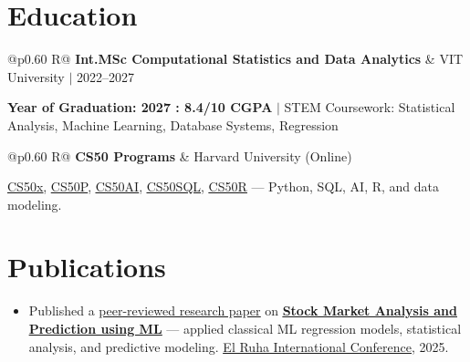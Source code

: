\documentclass[a4paper,10pt]{article}
\newcommand{\ulink}[2]{\href{#1}{\uline{#2}}}
\newcommand{\subheading}[1]{{\color[HTML]{0A0A0A}\fontsize{12}{14}\selectfont\bfseries #1}}
\newcommand{\meta}[1]{{\color[HTML]{5C5C5C}\fontsize{10.5}{12.5}\selectfont #1}}
\begin{document}
\vspace{2pt}

\section{Education}
\vspace{2pt}

\begin{tabularx}{\linewidth}{@{}p{0.60\linewidth} R@{}}
\subheading{Int.MSc Computational Statistics and Data Analytics} & \meta{VIT University $|$ 2022--2027}
\end{tabularx}
\vspace{1pt}
{\color[HTML]{3A3A3A}\fontsize{11}{14}\selectfont \textbf{Year of Graduation: 2027 : 8.4/10 CGPA} $|$ STEM Coursework: Statistical Analysis, Machine Learning, Database Systems, Regression}

\begin{tabularx}{\linewidth}{@{}p{0.60\linewidth} R@{}}
\subheading{CS50 Programs} & \meta{Harvard University (Online)}
\end{tabularx}
\vspace{1pt}
{\color[HTML]{3A3A3A}\fontsize{11}{14}\selectfont \ulink{https://cs50.harvard.edu/certificates/b14b78df-e05c-413e-a607-1dd27303053a}{CS50x}, \ulink{https://cs50.harvard.edu/certificates/32477052-9db4-49c4-a5a4-d7e58429ca2c}{CS50P}, \ulink{https://cs50.harvard.edu/certificates/9cdb4d4a-1250-4f8e-9fd7-191864e0f919}{CS50AI}, \ulink{https://cs50.harvard.edu/certificates/bc486f24-f085-4e61-8536-80940b97a1b9}{CS50SQL}, \ulink{https://cs50.harvard.edu/certificates/666838e6-a053-4d82-b179-a60fe745fd84}{CS50R} --- Python, SQL, AI, R, and data modeling.}

\vspace{2pt}

\section{Publications}
\vspace{2pt}
\begin{itemize}[nosep, leftmargin=1.5em, itemsep=1pt, topsep=2pt]
  \item {\color[HTML]{0A0A0A}\fontsize{11}{14}\selectfont
  Published a \ulink{https://www.elruha.org/_files/ugd/614b1f_6b95e1b697bf452b9907ba46e0151c05.pdf\#page=774}{peer-reviewed research paper} on \ulink{https://github.com/su-jin1425/Set-Project}{\textbf{Stock Market Analysis and Prediction using ML}} --- applied classical ML regression models, statistical analysis, and predictive modeling. \ulink{https://www.elruha.org/congress-books}{El Ruha International Conference}, 2025.}
\end{itemize}
\end{document}
